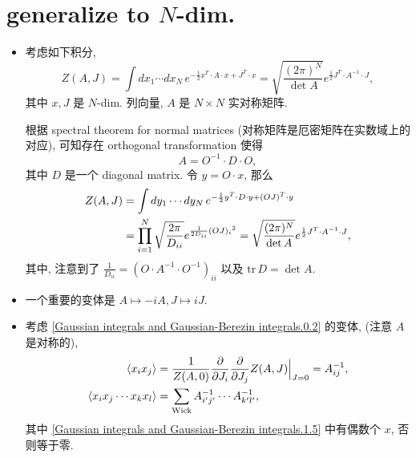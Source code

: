 \section{generalize to \texorpdfstring{$N$}{N}-dim.}
\begin{itemize}
	\item 考虑如下积分,
	\begin{equation} \label{Gaussian integrals and Gaussian-Berezin integrals.1.1}
		Z(A, J) = \int dx_1 \cdots dx_N \, e^{- \frac{1}{2} x^T \cdot A \cdot x + J^T \cdot x} = \sqrt{\frac{(2 \pi)^N}{\det A}} e^{\frac{1}{2} J^T \cdot A^{- 1} \cdot J},
	\end{equation}
	其中 $x, J$ 是 $N$-dim. 列向量, $A$ 是 $N \times N$ 实对称矩阵.
	
	\begin{tcolorbox}[title=calculation:]
		根据 spectral theorem for normal matrices (对称矩阵是厄密矩阵在实数域上的对应), 可知存在 orthogonal transformation 使得
		\begin{equation}
			A = O^{- 1} \cdot D \cdot O,
		\end{equation}
		其中 $D$ 是一个 diagonal matrix. 令 $y = O \cdot x$, 那么
		\begin{align}
			Z(A, J) &= \int dy_1 \cdots dy_N \, e^{- \frac{1}{2} y^T \cdot D \cdot y + (O J)^T \cdot y} \notag \\
			&= \prod_{i = 1}^N \sqrt{\frac{2 \pi}{D_{i i}}} e^{\frac{1}{2 D_{i i}} {(O J)_i}^2} = \sqrt{\frac{(2 \pi)^N}{\det A}} e^{\frac{1}{2} J^T \cdot A^{- 1} \cdot J},
		\end{align}
		其中, 注意到了 $\frac{1}{D_{i i}} = (O \cdot A^{- 1} \cdot O^{- 1})_{i i}$ 以及 $\mathrm{tr} \, D = \det A$.
	\end{tcolorbox}
	
	\item 一个重要的变体是 $A \mapsto - i A, J \mapsto i J$.
	
	\item 考虑 \eqref{Gaussian integrals and Gaussian-Berezin integrals.0.2} 的变体, (注意 $A$ 是对称的),
	\begin{align}
		\braket{x_i x_j} &= \frac{1}{Z(A, 0)} \frac{\partial}{\partial J_i} \frac{\partial}{\partial J_j} Z(A, J) \Big|_{J = 0} = A^{- 1}_{i j}, \\
		\braket{x_i x_j \cdots x_k x_l} &= \sum_{\text{Wick}} A^{- 1}_{i' j'} \cdots A^{- 1}_{k' l'}, \label{Gaussian integrals and Gaussian-Berezin integrals.1.5}
	\end{align}
	其中 \eqref{Gaussian integrals and Gaussian-Berezin integrals.1.5} 中有偶数个 $x$, 否则等于零.
	

\end{itemize}
